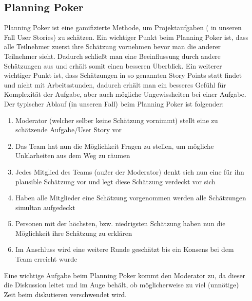 \subsection{Planning Poker}
Planning Poker ist eine gamifizierte Methode, um Projektaufgaben ( in unseren Fall User Stories) zu schätzen. Ein wichtiger Punkt beim Planning Poker ist, dass alle Teilnehmer zuerst ihre Schätzung vornehmen bevor man die anderer Teilnehmer sieht. Dadurch schließt man eine Beeinflussung durch andere Schätzungen aus und erhält somit einen besseren Überblick. Ein weiterer wichtiger Punkt ist, dass Schätzungen in so genannten Story Points statt findet und nicht mit Arbeitsstunden, dadurch erhält man ein besseres Gefühl für Komplexität der Aufgabe, aber auch mögliche Ungewissheiten bei einer Aufgabe. Der typischer Ablauf (in unseren Fall) beim Planning Poker ist folgender:
\begin{enumerate}
	\item Moderator (welcher selber keine Schätzung vornimmt) stellt eine zu schätzende Aufgabe/User Story vor
	\item Das Team hat nun die Möglichkeit Fragen zu stellen, um mögliche Unklarheiten aus dem Weg zu räumen
	\item Jedes Mitglied des Teams (außer der Moderator) denkt sich nun eine für ihn plausible Schätzung vor und legt diese Schätzung verdeckt vor sich
	\item Haben alle Mitglieder eine Schätzung vorgenommen werden alle Schätzungen simultan aufgedeckt
	\item Personen mit der höchsten, bzw. niedrigsten Schätzung haben nun die Möglichkeit ihre Schätzung zu erklären
	\item Im Anschluss wird eine weitere Runde geschätzt bis ein Konsens bei dem Team erreicht wurde
\end{enumerate}
Eine wichtige Aufgabe beim Planning Poker kommt den Moderator zu, da dieser die Diskussion leitet und im Auge behält, ob möglicherweise zu viel (unnötige) Zeit beim diskutieren verschwendet wird.

